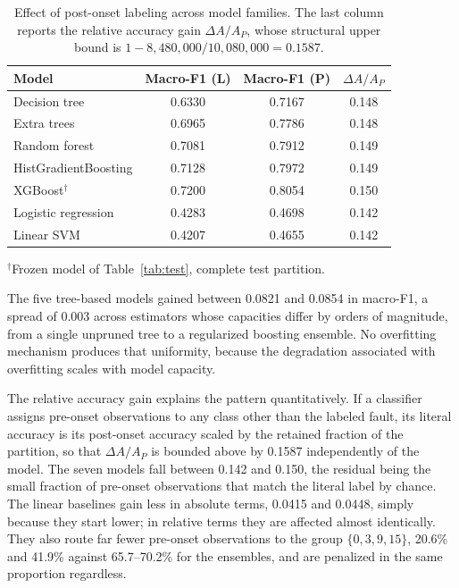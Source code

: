 \documentclass[10pt,twocolumn,a4paper]{article}
\begin{document}
\begin{table}[t]
\centering
\caption{Effect of post-onset labeling across model families. The last column
reports the relative accuracy gain $\Delta A/A_P$, whose structural upper bound
is $1-8{,}480{,}000/10{,}080{,}000=0.1587$.}
\label{tab:generality}
\small
\begin{tabular}{lccc}
\toprule
Model & Macro-F1 (L) & Macro-F1 (P) & $\Delta A/A_P$\\
\midrule
Decision tree           & 0.6330 & 0.7167 & 0.148\\
Extra trees             & 0.6965 & 0.7786 & 0.148\\
Random forest           & 0.7081 & 0.7912 & 0.149\\
HistGradientBoosting    & 0.7128 & 0.7972 & 0.149\\
XGBoost$^{\dagger}$     & 0.7200 & 0.8054 & 0.150\\
Logistic regression     & 0.4283 & 0.4698 & 0.142\\
Linear SVM              & 0.4207 & 0.4655 & 0.142\\
\bottomrule
\end{tabular}

\vspace{2pt}
{\footnotesize $^{\dagger}$Frozen model of Table~\ref{tab:test}, complete test
partition.}
\end{table}

The five tree-based models gained between 0.0821 and 0.0854 in macro-F1, a
spread of 0.003 across estimators whose capacities differ by orders of
magnitude, from a single unpruned tree to a regularized boosting ensemble. No
overfitting mechanism produces that uniformity, because the degradation
associated with overfitting scales with model capacity.

The relative accuracy gain explains the pattern quantitatively. If a classifier
assigns pre-onset observations to any class other than the labeled fault, its
literal accuracy is its post-onset accuracy scaled by the retained fraction of
the partition, so that $\Delta A/A_P$ is bounded above by 0.1587 independently
of the model. The seven models fall between 0.142 and 0.150, the residual being
the small fraction of pre-onset observations that match the literal label by
chance. The linear baselines gain less in absolute terms, 0.0415 and 0.0448,
simply because they start lower; in relative terms they are affected almost
identically. They also route far fewer pre-onset observations to the group
$\{0,3,9,15\}$, 20.6\% and 41.9\% against 65.7--70.2\% for the ensembles, and
are penalized in the same proportion regardless.
\end{document}
